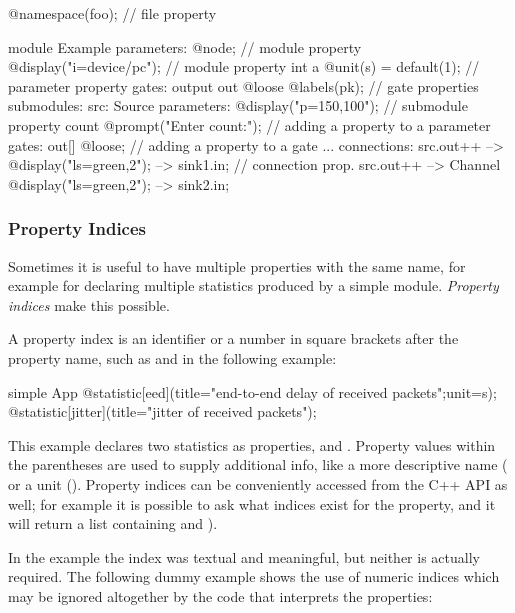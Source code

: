\begin{ned}
@namespace(foo);  // file property

module Example
{
    parameters:
       @node;   // module property
       @display("i=device/pc");   // module property
       int a @unit(s) = default(1); // parameter property
    gates:
       output out @loose @labels(pk);  // gate properties
    submodules:
       src: Source {
           parameters:
              @display("p=150,100");  // submodule property
              count @prompt("Enter count:"); // adding a property to a parameter
           gates:
              out[] @loose;  // adding a property to a gate
       }
       ...
    connections:
       src.out++ --> { @display("ls=green,2"); } --> sink1.in; // connection prop.
       src.out++ --> Channel { @display("ls=green,2"); } --> sink2.in;
}
\end{ned}


\subsubsection{Property Indices}

Sometimes it is useful to have multiple properties with the same name,
for example for declaring multiple statistics produced by a simple module.
\textit{Property indices} make this possible.

A property index is an identifier or a number in square brackets after the
property name, such as  and  in the following example:

\begin{ned}
simple App {
    @statistic[eed](title="end-to-end delay of received packets";unit=s);
    @statistic[jitter](title="jitter of received packets");
}
\end{ned}

This example declares two statistics as  properties,
 and . Property values within
the parentheses are used to supply additional info, like a more
descriptive name ( or a unit ().
Property indices can be conveniently accessed from the C++ API as
well; for example it is possible to ask what indices exist for the
 property, and it will return a list containing
 and ).

In the  example the index was textual and meaningful,
but neither is actually required. The following dummy example
shows the use of numeric indices which may be ignored altogether
by the code that interprets the properties:

